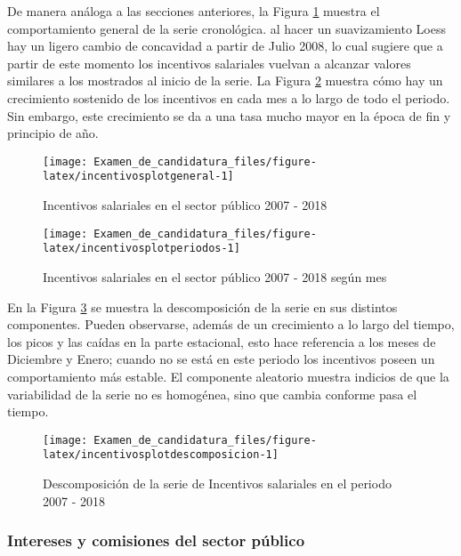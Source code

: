 \documentclass[
]{article}
\begin{document}
De manera análoga a las secciones anteriores, la Figura
\ref{fig:incentivosplotgeneral} muestra el comportamiento general de la
serie cronológica. al hacer un suavizamiento Loess hay un ligero cambio
de concavidad a partir de Julio 2008, lo cual sugiere que a partir de
este momento los incentivos salariales vuelvan a alcanzar valores
similares a los mostrados al inicio de la serie. La Figura
\ref{fig:incentivosplotperiodos} muestra cómo hay un crecimiento
sostenido de los incentivos en cada mes a lo largo de todo el periodo.
Sin embargo, este crecimiento se da a una tasa mucho mayor en la época
de fin y principio de año.

\begin{figure}[H]
\texttt{[image: Examen\_de\_candidatura\_files/figure-latex/incentivosplotgeneral-1]} \caption{Incentivos salariales en el sector público 2007 - 2018}\label{fig:incentivosplotgeneral}
\end{figure}

\begin{figure}[H]
\texttt{[image: Examen\_de\_candidatura\_files/figure-latex/incentivosplotperiodos-1]} \caption{Incentivos salariales en el sector público 2007 - 2018 según mes}\label{fig:incentivosplotperiodos}
\end{figure}

En la Figura \ref{fig:incentivosplotdescomposicion} se muestra la
descomposición de la serie en sus distintos componentes. Pueden
observarse, además de un crecimiento a lo largo del tiempo, los picos y
las caídas en la parte estacional, esto hace referencia a los meses de
Diciembre y Enero; cuando no se está en este periodo los incentivos
poseen un comportamiento más estable. El componente aleatorio muestra
indicios de que la variabilidad de la serie no es homogénea, sino que
cambia conforme pasa el tiempo.

\begin{figure}[H]
\texttt{[image: Examen\_de\_candidatura\_files/figure-latex/incentivosplotdescomposicion-1]} \caption{Descomposición de la serie de Incentivos salariales en el periodo 2007 - 2018}\label{fig:incentivosplotdescomposicion}
\end{figure}

\subsubsection{Intereses y comisiones del sector público}
\end{document}
